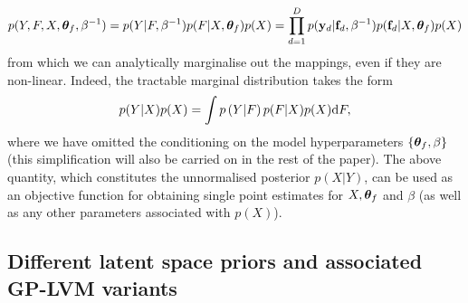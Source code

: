 \begin{equation}
\label{joint}
p(Y,F,X, \boldsymbol \theta_f, \beta^{-1}) = p(Y|F, \beta^{-1}) p(F|X, \boldsymbol \theta_f) p(X)= 
 \prod_{d=1}^D  p(\mathbf{y}_d | \mathbf{f}_d, \beta^{-1}) p(\mathbf{f}_d | X, \boldsymbol \theta_f) p(X)
\end{equation}
from which we can analytically marginalise out the mappings, even if they are non-linear.
Indeed, the tractable marginal distribution takes the form
\begin{equation}
 \label{gplvmLikelihood}
p(Y | X) p(X) = \int p \left( Y |F\right) p(F | X) p(X) \text{d} F  ,
\end{equation}
where we have omitted the conditioning on the model hyperparameters $\{ \boldsymbol \theta_f, \beta \}$ (this simplification will
also be carried on in the rest of the paper).
The above quantity, which constitutes the unnormalised posterior $p(X|Y)$,
can be used as an objective function for obtaining single point estimates for
$X, \boldsymbol \theta_f$ and $\beta$ (as well as any other parameters associated with $p(X)$).




\subsection{Different latent space priors and associated GP-LVM variants \label{section:gplvmDynamics}}


